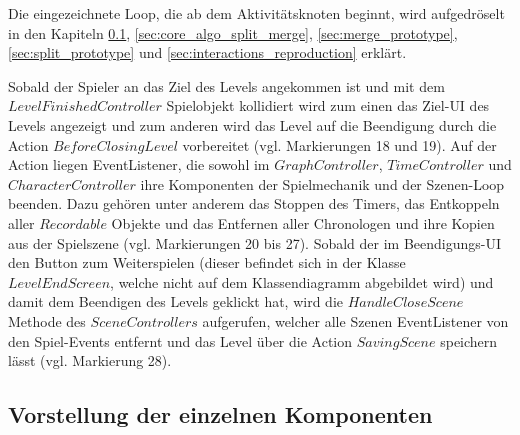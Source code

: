 Die eingezeichnete Loop, die ab dem Aktivitätsknoten  beginnt, wird aufgedröselt in den Kapiteln \ref{sec:components}, \ref{sec:core_algo_split_merge}, \ref{sec:merge_prototype}, \ref{sec:split_prototype} und \ref{sec:interactions_reproduction} erklärt.

Sobald der Spieler an das Ziel des Levels angekommen ist und mit dem \\ $LevelFinishedController$ Spielobjekt kollidiert wird zum einen das Ziel-\ac{UI} des Levels angezeigt und zum anderen wird das Level auf die Beendigung durch die Action $BeforeClosingLevel$ vorbereitet (vgl. Markierungen 18 und 19). Auf der Action liegen EventListener, die sowohl im $GraphController$, $TimeController$ und $CharacterController$ ihre Komponenten der Spielmechanik und der Szenen-Loop beenden. Dazu gehören unter anderem das Stoppen des Timers, das Entkoppeln aller $Recordable$ Objekte und das Entfernen aller Chronologen und ihre Kopien aus der Spielszene (vgl. Markierungen 20 bis 27). Sobald der im Beendigungs-\ac{UI} den Button zum Weiterspielen (dieser befindet sich in der Klasse $LevelEndScreen$, welche nicht auf dem Klassendiagramm abgebildet wird) und damit dem Beendigen des Levels geklickt hat, wird die $HandleCloseScene$ Methode des $SceneControllers$ aufgerufen, welcher alle Szenen EventListener von den Spiel-Events entfernt und das Level über die Action $SavingScene$ speichern lässt (vgl. Markierung 28).

\subsection{Vorstellung der einzelnen Komponenten}\label{sec:components}

